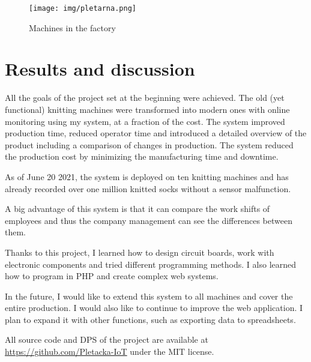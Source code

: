 \documentclass[12pt, a4paper]{article}
\begin{document}
\begin{figure}[t]
    \centering
    \texttt{[image: img/pletarna.png]}
    \caption{Machines in the factory}
    \label{fig:MachinesInTheFactory}
\end{figure}

\newpage
\section*{Results and discussion}

All the goals of the project set at the beginning were achieved.
The old (yet functional) knitting machines were transformed into modern ones with online monitoring using my system, at a fraction of the cost.
The system improved production time, reduced operator time and introduced a detailed overview of the product including a comparison of changes in production.
The system reduced the production cost by minimizing the manufacturing time and downtime.

As of June 20 2021, the system is deployed on ten knitting machines and has already recorded over one million knitted socks without a sensor malfunction.

A big advantage of this system is that it can compare the work shifts of employees and thus the company management can see the differences between them.

Thanks to this project, I learned how to design circuit boards, work with electronic components and tried different programming methods.
I also learned how to program in PHP and create complex web systems.

In the future, I would like to extend this system to all machines and cover the entire production.
I would also like to continue to improve the web application. I plan to expand it with other functions, such as exporting data to spreadsheets.

All source code and DPS of the project are available at \url{https://github.com/Pletacka-IoT} under the MIT license.


\newpage

\appendix
\end{document}
